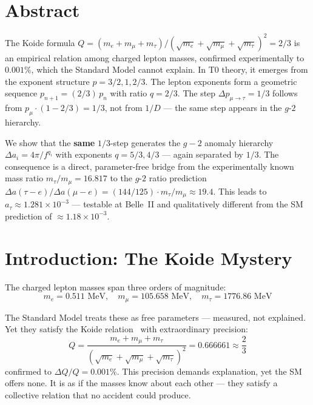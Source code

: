\section*{Abstract}
	The Koide formula $Q = (m_e + m_\mu + m_\tau)/(\sqrt{m_e} + \sqrt{m_\mu} + \sqrt{m_\tau})^2 = 2/3$ is an empirical relation among charged lepton masses, confirmed experimentally to $0.001\%$, which the Standard Model cannot explain. In T0 theory, it emerges from the exponent structure $p = 3/2, 1, 2/3$. The lepton exponents form a geometric sequence $p_{n+1} = (2/3)\,p_n$ with ratio $q = 2/3$. The step $\Delta p_{\mu\to\tau} = 1/3$ follows from $p_\mu \cdot (1 - 2/3) = 1/3$, not from $1/D$ --- the same step appears in the $g$-$2$ hierarchy.
	
	We show that the \textbf{same} $1/3$-step generates the $g-2$ anomaly hierarchy $\Delta a_i = 4\pi/f^{q_i}$ with exponents $q = 5/3, 4/3$ --- again separated by $1/3$. The consequence is a direct, parameter-free bridge from the experimentally known mass ratio $m_\tau/m_\mu = 16.817$ to the $g$-$2$ ratio prediction $\Delta a(\tau{-}e)/\Delta a(\mu{-}e) = (144/125) \cdot m_\tau/m_\mu \approx 19.4$. This leads to $a_\tau \approx 1.281 \times 10^{-3}$ --- testable at Belle~II and qualitatively different from the SM prediction of $\approx 1.18 \times 10^{-3}$.

\section{Introduction: The Koide Mystery}

The charged lepton masses span three orders of magnitude:
\begin{equation}
	m_e = 0.511 \text{ MeV}, \quad m_\mu = 105.658 \text{ MeV}, \quad m_\tau = 1776.86 \text{ MeV}
\end{equation}

The Standard Model treats these as free parameters --- measured, not explained. Yet they satisfy the Koide relation~\cite{Koide1983} with extraordinary precision:
\begin{equation}
	\boxed{Q = \frac{m_e + m_\mu + m_\tau}{\left(\sqrt{m_e} + \sqrt{m_\mu} + \sqrt{m_\tau}\right)^2} = 0.666661 \approx \frac{2}{3}}
	\label{eq:koide}
\end{equation}
confirmed to $\Delta Q/Q = 0.001\%$. This precision demands explanation, yet the SM offers none. It is as if the masses know about each other --- they satisfy a collective relation that no accident could produce.

